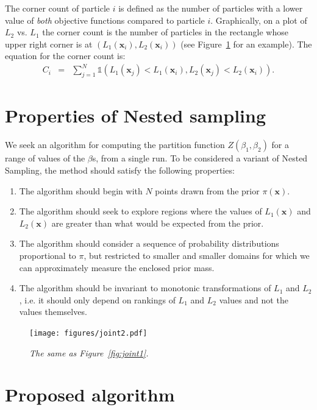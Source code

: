 \documentclass[journal,article,accept,moreauthors,pdftex,12pt,a4paper]{mdpi}
\newcommand{\xx}{\boldsymbol{x}}
\begin{document}
The corner count of particle $i$ is defined as the number of particles with
a lower value of {\em both} objective functions compared to particle $i$.
Graphically, on a plot of $L_2$ vs. $L_1$ the corner count is the number of
particles in the rectangle whose upper right corner is at
$\left(L_1(\xx_i), L_2(\xx_i)\right)$ (see Figure~\ref{fig:joint2} for an
example). The equation for the corner count is:
\begin{eqnarray}
C_i &=& \sum_{j=1}^N \mathds{1}\left(L_1(\xx_j) < L_1(\xx_i),
L_2(\xx_j) < L_2(\xx_i)
\right).\label{eqn:corner_count}
\end{eqnarray}


\section{Properties of Nested sampling}

We seek an algorithm for computing the partition function
$Z(\beta_1, \beta_2)$ for a range of values of the $\beta$s, from a single
run. To be considered a variant of Nested Sampling, the method should satisfy
the following properties:
\begin{enumerate}
\item The algorithm should begin with $N$ points drawn from the prior $\pi(\xx)$.
\item The algorithm should seek to explore regions where the values of
$L_1(\xx)$ and $L_2(\xx)$ are greater than what would be expected from the
prior.
\item The algorithm should consider a sequence of probability
distributions proportional to $\pi$, but restricted to smaller and smaller
domains for which we can approximately measure the enclosed prior mass.
\item The algorithm should be invariant to monotonic transformations of
$L_1$ and $L_2$, i.e. it should only depend on rankings of $L_1$ and $L_2$
values and not the values themselves.
\end{enumerate}


\begin{figure}
\centering
\texttt{[image: figures/joint2.pdf]}
\caption{\it The same as Figure~\ref{fig:joint1}.
\label{fig:joint2}}
\end{figure}



\section{Proposed algorithm}\label{sec:algorithm}
\end{document}
